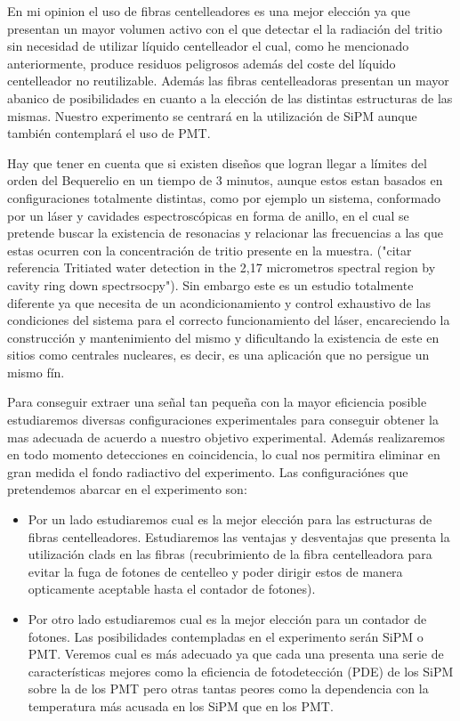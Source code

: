 En mi opinion el uso de fibras centelleadores es una mejor elección ya que presentan un mayor volumen activo con el que detectar el la radiación del tritio  sin necesidad de utilizar líquido centelleador el cual, como he mencionado anteriormente, produce residuos peligrosos además del coste del líquido centelleador no reutilizable. Además las fibras centelleadoras presentan un mayor abanico de posibilidades en cuanto a la elección de las distintas estructuras de las mismas. Nuestro experimento se centrará en la utilización de SiPM aunque también contemplará el uso de PMT. 

Hay que tener en cuenta que si existen diseños que logran llegar a límites del orden del Bequerelio en un tiempo de 3 minutos, aunque estos estan basados en configuraciones totalmente distintas, como por ejemplo un sistema, conformado por un láser y cavidades espectroscópicas en forma de anillo, en el cual se pretende buscar la existencia de resonacias y relacionar las frecuencias a las que estas ocurren con la concentración de tritio presente en la muestra. ("citar referencia Tritiated water detection in the 2,17 micrometros spectral region by cavity ring down spectrsocpy"). Sin embargo este es un estudio totalmente diferente ya que necesita de un acondicionamiento y control exhaustivo de las condiciones del sistema para el correcto funcionamiento del láser, encareciendo la construcción y mantenimiento del mismo y dificultando la existencia de este en sitios como centrales nucleares, es decir, es una aplicación que no persigue un mismo fín.

Para conseguir extraer una señal tan pequeña con la mayor eficiencia posible estudiaremos diversas configuraciones experimentales para conseguir obtener la mas adecuada de acuerdo a nuestro objetivo experimental. Además realizaremos en todo momento detecciones en coincidencia, lo cual nos permitira eliminar en gran medida el fondo radiactivo del experimento. Las configuraciónes que pretendemos abarcar en el experimento son: 
\begin{itemize}
\item {}
Por un lado estudiaremos cual es la mejor elección para las estructuras de fibras centelleadores. Estudiaremos las ventajas y desventajas que presenta la utilización clads en las fibras (recubrimiento de la fibra centelleadora para evitar la fuga de fotones de centelleo y poder dirigir estos de manera opticamente aceptable hasta el contador de fotones). 
\item {}
Por otro lado estudiaremos cual es la mejor elección para un contador de fotones. Las posibilidades contempladas en el experimento serán SiPM o PMT. Veremos cual es más adecuado ya que cada una presenta una serie de características mejores como la eficiencia de fotodetección (PDE) de los SiPM sobre la de los PMT pero otras tantas peores como la dependencia con la temperatura más acusada en los SiPM que en los PMT.
\end{itemize}

